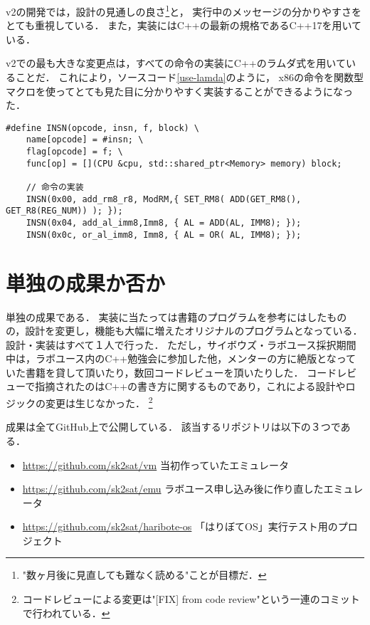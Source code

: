 \documentclass[10pt,a4j]{jsarticle}
\begin{document}
v2の開発では，設計の見通しの良さ\footnote{"数ヶ月後に見直しても難なく読める"ことが目標だ．}と，
実行中のメッセージの分かりやすさをとても重視している．
また，実装にはC++の最新の規格であるC++17を用いている．

v2での最も大きな変更点は，すべての命令の実装にC++のラムダ式を用いていることだ．
これにより，ソースコード\ref{use-lamda}のように，
x86の命令を関数型マクロを使ってとても見た目に分かりやすく実装することができるようになった．

\begin{lstlisting}[caption=ラムダ式を使った命令の実装の一部,label=use-lamda]
#define INSN(opcode, insn, f, block) \
	name[opcode] = #insn; \
	flag[opcode] = f; \
	func[op] = [](CPU &cpu, std::shared_ptr<Memory> memory) block;

	// 命令の実装
	INSN(0x00, add_rm8_r8, ModRM,{ SET_RM8( ADD(GET_RM8(), GET_R8(REG_NUM)) ); });
	INSN(0x04, add_al_imm8,Imm8, { AL = ADD(AL, IMM8); });
	INSN(0x0c, or_al_imm8, Imm8, { AL = OR( AL, IMM8); });
\end{lstlisting}


\section{単独の成果か否か}
単独の成果である．
実装に当たっては書籍\cite{learn-x86-by-emu}のプログラムを参考にはしたものの，設計を変更し，機能も大幅に増えたオリジナルのプログラムとなっている．
設計・実装はすべて１人で行った．
ただし，サイボウズ・ラボユース採択期間中は，ラボユース内のC++勉強会に参加した他，メンターの方に絶版となっていた書籍\cite{read-486}を貸して頂いたり，数回コードレビューを頂いたりした．
コードレビューで指摘されたのはC++の書き方に関するものであり，これによる設計やロジックの変更は生じなかった．
\footnote{コードレビューによる変更は"[FIX] from code review"という一連のコミットで行われている．}

成果は全てGitHub上で公開している．
該当するリポジトリは以下の３つである．
\begin{itemize}
	\item \url{https://github.com/sk2sat/vm}			当初作っていたエミュレータ
	\item \url{https://github.com/sk2sat/emu}			ラボユース申し込み後に作り直したエミュレータ
	\item \url{https://github.com/sk2sat/haribote-os}	「はりぼてOS」実行テスト用のプロジェクト
\end{itemize}
\end{document}
